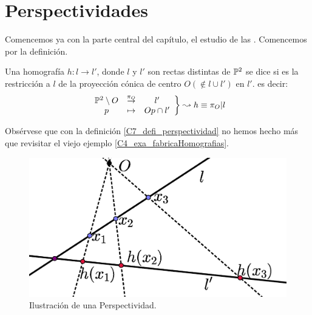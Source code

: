\section{Perspectividades}
\label{C7_Perspectividades}
Comencemos ya con la parte central del capítulo, el estudio de las . Comencemos por la definición.
\begin{defi}[Perspectividad]
	\label{C7_defi_perspectividad}
	Una homografía $h:l\to l'$, donde $l$ y $l'$ son rectas distintas de $\mathbb{P}^2$ se dice  si es la restricción a $l$ de la proyección cónica de centro $O(\not\in l\cup l')$ en $l'$. es decir:
	\[\left.\begin{array}{ccc}\mathbb{P}^2\setminus{O}&\stackrel{\pi_O}{\to}&l'\\p& \mapsto & Op\cap l'\end{array}\right\}\leadsto h\equiv \pi_O|l\]
\end{defi}
Obsérvese que con la definición \ref{C7_defi_perspectividad} no hemos hecho más que revisitar el viejo ejemplo \ref{C4_exa_fabricaHomografias}.
\begin{figure}[h]
	\centering
	\includegraphics[scale=.3]{Graficos/perspectividad.eps}
	\caption{Ilustración de una Perspectividad.}
	\label{C7_img_perspectividad}
\end{figure}

